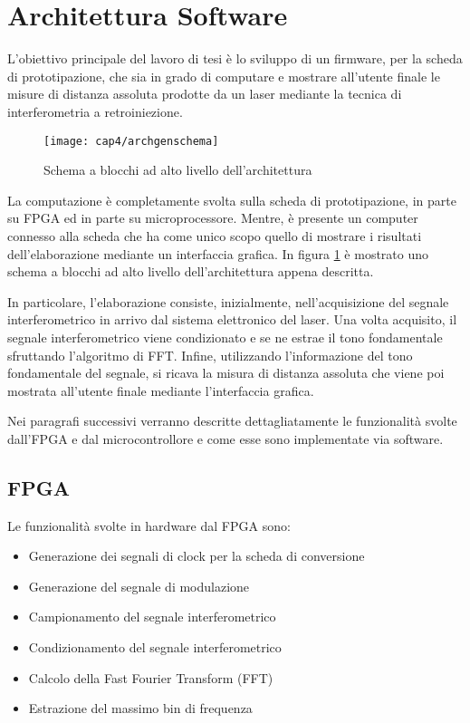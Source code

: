 \section{Architettura Software}
L'obiettivo principale del lavoro di tesi è lo sviluppo di un firmware, per la scheda di prototipazione, che sia in grado di computare e mostrare all'utente finale le misure di distanza assoluta prodotte da un laser mediante la tecnica di interferometria a retroiniezione.
\begin{figure}  
  \begin{center}
    \texttt{[image: cap4/archgenschema]}
    \caption{Schema a blocchi ad alto livello dell'architettura}
    \label{archgenschema}
  \end{center}
\end{figure}

La computazione è completamente svolta sulla scheda di prototipazione, in parte su FPGA ed in parte su microprocessore. Mentre, è presente un computer connesso alla scheda che ha come unico scopo quello di mostrare i risultati dell'elaborazione mediante un interfaccia grafica. In figura \ref{archgenschema} è mostrato uno schema a blocchi ad alto livello dell'architettura appena descritta.

In particolare, l'elaborazione consiste, inizialmente, nell'acquisizione del segnale interferometrico in arrivo dal sistema elettronico del laser. Una volta acquisito, il segnale interferometrico viene condizionato e se ne estrae il tono fondamentale sfruttando l'algoritmo di FFT. Infine, utilizzando l'informazione del tono fondamentale del segnale, si ricava la misura di distanza assoluta che viene poi mostrata all'utente finale mediante l'interfaccia grafica.

Nei paragrafi successivi verranno descritte dettagliatamente le funzionalità svolte dall'FPGA e dal microcontrollore e come esse sono implementate via software.

\subsection{FPGA}
Le funzionalità svolte in hardware dal FPGA sono:
\begin{itemize}
	\item Generazione dei segnali di clock per la scheda di conversione
	\item Generazione del segnale di modulazione
	\item Campionamento del segnale interferometrico
	\item Condizionamento del segnale interferometrico
	\item Calcolo della Fast Fourier Transform (FFT)
	\item Estrazione del massimo bin di frequenza
\end{itemize}

